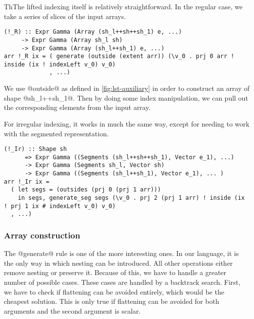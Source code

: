 ThThe lifted indexing itself is relatively straightforward. In the regular case, we take a series of slices of the input arrays.
%
\begin{lstlisting}[style=ndp]
(!_R) :: Expr Gamma (Array (sh_l++sh++sh_1) e, ...)
     -> Expr Gamma (Array sh_l sh)
     -> Expr Gamma (Array (sh_l++sh_1) e, ...)
arr !_R ix = ( generate (outside (extent arr)) (\v_0 . prj 0 arr ! inside (ix ! indexLeft v_0) v_0)
             , ...)
\end{lstlisting}
%
We use @outside@ as defined in \ref{fig:lst-auxiliary} in order to construct an array of shape @sh_l++sh_1@. Then by doing some index manipulation, we can pull out the corresponding elements from the input array.

For irregular indexing, it works in much the same way, except for needing to work with the segmented representation.
%
\begin{lstlisting}[style=ndp]
(!_Ir) :: Shape sh
      => Expr Gamma ((Segments (sh_l++sh++sh_1), Vector e_1), ...)
      -> Expr Gamma (Segments sh_l, Vector sh)
      -> Expr Gamma ((Segments (sh_l++sh_1), Vector e_1), ... )
arr !_Ir ix =
  ( let segs = (outsides (prj 0 (prj 1 arr)))
    in segs, generate_seg segs (\v_0 . prj 2 (prj 1 arr) ! inside (ix ! prj 1 ix # indexLeft v_0) v_0)
  , ...)
\end{lstlisting}

\subsubsection{Array construction}
The @generate@ rule is one of the more interesting ones. In our language, it is the only way in which nesting can be introduced. All other operations either remove nesting or preserve it. Because of this, we have to handle a greater number of possible cases. These cases are handled by a backtrack search. First, we have to check if flattening can be avoided entirely, which would be the cheapest solution. This is only true if flattening can be avoided for both arguments and the second argument is scalar.

